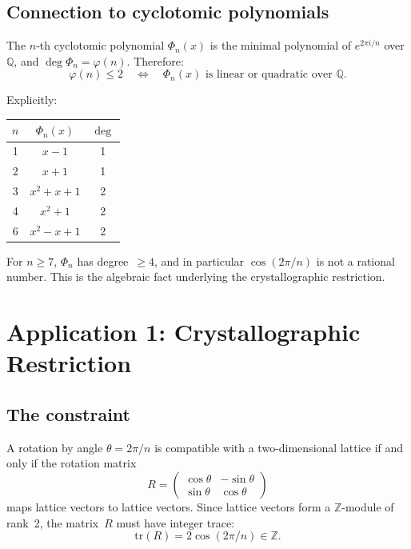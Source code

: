 \documentclass[preprint]{revtex4-2}
\begin{document}
\subsection{Connection to cyclotomic polynomials}

The $n$-th cyclotomic polynomial $\Phi_n(x)$ is the minimal polynomial of $e^{2\pi i/n}$ over $\mathbb{Q}$, and $\deg \Phi_n = \varphi(n)$. Therefore:
\begin{equation}
\varphi(n) \leq 2 \quad \Longleftrightarrow \quad \Phi_n(x) \text{ is linear or quadratic over } \mathbb{Q}.
\end{equation}

Explicitly:

\begin{center}
\begin{tabular}{ccc}
\toprule
$n$ & $\Phi_n(x)$ & $\deg$ \\
\midrule
1 & $x - 1$ & 1 \\
2 & $x + 1$ & 1 \\
3 & $x^2 + x + 1$ & 2 \\
4 & $x^2 + 1$ & 2 \\
6 & $x^2 - x + 1$ & 2 \\
\bottomrule
\end{tabular}
\end{center}

For $n \geq 7$, $\Phi_n$ has degree~$\geq 4$, and in particular $\cos(2\pi/n)$ is not a rational number. This is the algebraic fact underlying the crystallographic restriction.

\section{Application 1: Crystallographic Restriction}\label{sec:crystal}

\subsection{The constraint}

A rotation by angle $\theta = 2\pi/n$ is compatible with a two-dimensional lattice if and only if the rotation matrix
\begin{equation}
R = \begin{pmatrix} \cos\theta & -\sin\theta \\ \sin\theta & \cos\theta \end{pmatrix}
\end{equation}
maps lattice vectors to lattice vectors. Since lattice vectors form a $\mathbb{Z}$-module of rank~2, the matrix~$R$ must have integer trace:
\begin{equation}
\mathrm{tr}(R) = 2\cos(2\pi/n) \in \mathbb{Z}.
\end{equation}
\end{document}
